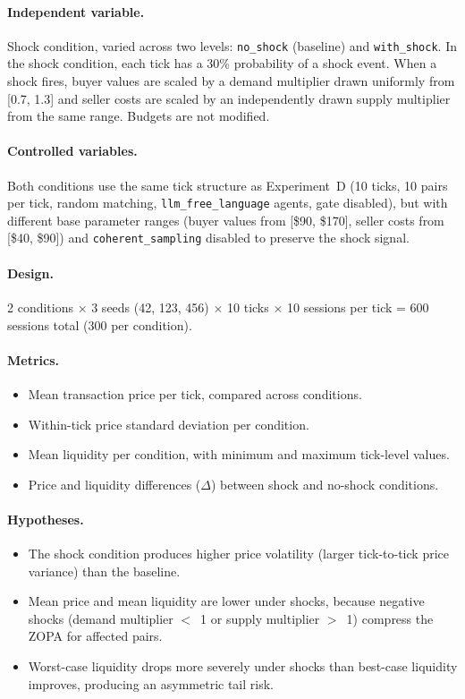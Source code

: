 \paragraph{Independent variable.}
Shock condition, varied across two levels: \texttt{no\_shock} (baseline) and \texttt{with\_shock}.  In the shock condition, each tick has a 30\% probability of a shock event.  When a shock fires, buyer values are scaled by a demand multiplier drawn uniformly from [0.7, 1.3] and seller costs are scaled by an independently drawn supply multiplier from the same range.  Budgets are not modified.

\paragraph{Controlled variables.}
Both conditions use the same tick structure as Experiment~D (10 ticks, 10 pairs per tick, random matching, \texttt{llm\_free\_language} agents, gate disabled), but with different base parameter ranges (buyer values from [\$90, \$170], seller costs from [\$40, \$90]) and \texttt{coherent\_sampling} disabled to preserve the shock signal.

\paragraph{Design.}
2 conditions $\times$ 3 seeds (42, 123, 456) $\times$ 10 ticks $\times$ 10 sessions per tick = 600 sessions total (300 per condition).

\paragraph{Metrics.}
\begin{itemize}
    \item Mean transaction price per tick, compared across conditions.
    \item Within-tick price standard deviation per condition.
    \item Mean liquidity per condition, with minimum and maximum tick-level values.
    \item Price and liquidity differences ($\Delta$) between shock and no-shock conditions.
\end{itemize}

\paragraph{Hypotheses.}
\begin{itemize}
    \item[\textbf{H-E1.}] The shock condition produces higher price volatility (larger tick-to-tick price variance) than the baseline.
    \item[\textbf{H-E2.}] Mean price and mean liquidity are lower under shocks, because negative shocks (demand multiplier $<$~1 or supply multiplier $>$~1) compress the ZOPA for affected pairs.
    \item[\textbf{H-E3.}] Worst-case liquidity drops more severely under shocks than best-case liquidity improves, producing an asymmetric tail risk.
\end{itemize}

